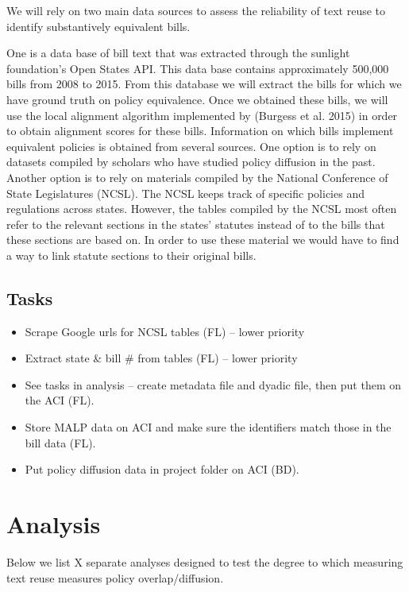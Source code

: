 \documentclass[12pt]{article} %
\begin{document}
We will rely on two main data sources to assess the reliability of text reuse to
identify substantively equivalent bills. 

One is a data base of bill text that was extracted through the sunlight
foundation's Open States API. This data base contains approximately 500,000
bills from 2008 to 2015. From this database we will extract the bills for which we
have ground truth on policy equivalence. 
Once we obtained these bills, we will use the local alignment algorithm
implemented by (Burgess et al. 2015) in order to obtain alignment scores for
these bills. 
Information on which bills implement equivalent policies is obtained from
several sources. One option is to rely on datasets compiled by scholars who have
studied policy diffusion in the past. Another option is to rely on materials
compiled by the National Conference of State Legislatures (NCSL). The NCSL keeps
track of specific policies and regulations across states. However, the tables
compiled by the NCSL most often refer to the relevant sections in the states'
statutes instead of to the bills that these sections are based on. In order to
use these material we would have to find a way to link statute sections to their
original bills. 


\subsection{Tasks}
\begin{itemize}
\item Scrape Google urls for NCSL tables (FL) -- lower priority
\item Extract state  \& bill \# from tables (FL) -- lower priority
\item See tasks in analysis -- create metadata file and dyadic file, then put them on the ACI (FL).
\item Store MALP data on ACI and make sure the identifiers match those in the bill data (FL). 
\item Put policy diffusion data in project folder on ACI (BD).
\end{itemize}

\section{Analysis}
 Below we list X separate analyses designed to test the degree to which measuring text reuse measures policy overlap/diffusion. 
\end{document}
